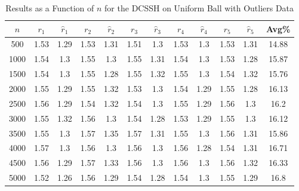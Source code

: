 \documentclass[11pt,twoside]{report}
\theoremstyle{definition}
\numberwithin{theorem}{section}
\numberwithin{definition}{section}
\numberwithin{lemma}{section}
\numberwithin{proposition}{section}
\numberwithin{equation}{section}
\numberwithin{figure}{section}
\begin{document}
\begin{appendices}
    \begin{table}[ht]
        \centering
        \begin{tabular}{|c||cc||cc||cc||cc||cc||c|} \hline
            $n$&$r_1$&$\hat{r}_1$&$r_2$&$\hat{r}_2$&$r_3$&$\hat{r}_3$&$r_4$&$\hat{r}_4$&$r_5$&$\hat{r}_5$&Avg\% \\ \hline
            500&1.53&1.29&1.53&1.31&1.51&1.3&1.53&1.3&1.53&1.31&14.88 \\
            1000&1.54&1.3&1.55&1.3&1.55&1.31&1.54&1.3&1.53&1.28&15.87 \\
            1500&1.54&1.3&1.55&1.28&1.55&1.32&1.55&1.3&1.54&1.32&15.76 \\
            2000&1.55&1.29&1.55&1.32&1.53&1.3&1.54&1.29&1.55&1.28&16.13 \\
            2500&1.56&1.29&1.54&1.32&1.54&1.3&1.55&1.29&1.56&1.3&16.2 \\
            3000&1.55&1.32&1.56&1.3&1.54&1.28&1.53&1.29&1.55&1.3&16.12 \\
            3500&1.55&1.3&1.57&1.35&1.57&1.31&1.55&1.3&1.56&1.31&15.86 \\
            4000&1.57&1.3&1.56&1.3&1.56&1.3&1.56&1.28&1.54&1.31&16.71 \\
            4500&1.56&1.29&1.57&1.33&1.56&1.3&1.56&1.3&1.56&1.32&16.33 \\
            5000&1.52&1.26&1.56&1.29&1.54&1.28&1.54&1.3&1.55&1.29&16.8 \\ \hline
        \end{tabular}
        \caption{Results as a Function of $n$ for the DCSSH on Uniform Ball with Outliers Data}
        \label{tab:uniform_ball_with_outliers_dcssh_table_n}
    \end{table}
    

\end{appendices}
\end{document}
